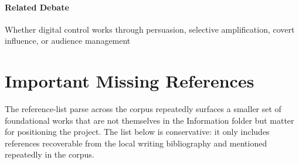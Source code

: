 \documentclass[12pt]{article}
\begin{document}
\paragraph{Related Debate} Whether digital control works through persuasion, selective amplification, covert influence, or audience management



        \section{Important Missing References}

        The reference-list parse across the corpus repeatedly surfaces a smaller set of foundational works that are not themselves in the Information folder but matter for positioning the project. The list below is conservative: it only includes references recoverable from the local writing bibliography and mentioned repeatedly in the corpus.
\end{document}
